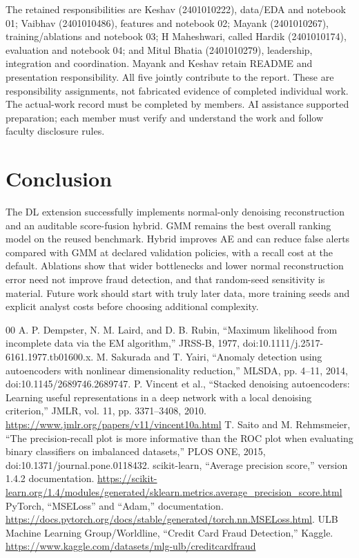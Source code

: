\documentclass[conference]{IEEEtran}
\begin{document}
The retained responsibilities are Keshav (2401010222), data/EDA and notebook 01; Vaibhav (2401010486), features and notebook 02; Mayank (2401010267), training/ablations and notebook 03; H Maheshwari, called Hardik (2401010174), evaluation and notebook 04; and Mitul Bhatia (2401010279), leadership, integration and coordination. Mayank and Keshav retain README and presentation responsibility. All five jointly contribute to the report. These are responsibility assignments, not fabricated evidence of completed individual work. The actual-work record must be completed by members. AI assistance supported preparation; each member must verify and understand the work and follow faculty disclosure rules.

\section{Conclusion}
The DL extension successfully implements normal-only denoising reconstruction and an auditable score-fusion hybrid. GMM remains the best overall ranking model on the reused benchmark. Hybrid improves AE and can reduce false alerts compared with GMM at declared validation policies, with a recall cost at the default. Ablations show that wider bottlenecks and lower normal reconstruction error need not improve fraud detection, and that random-seed sensitivity is material. Future work should start with truly later data, more training seeds and explicit analyst costs before choosing additional complexity.

\begin{thebibliography}{00}
 A. P. Dempster, N. M. Laird, and D. B. Rubin, ``Maximum likelihood from incomplete data via the EM algorithm,'' JRSS-B, 1977, doi:10.1111/j.2517-6161.1977.tb01600.x.
 M. Sakurada and T. Yairi, ``Anomaly detection using autoencoders with nonlinear dimensionality reduction,'' MLSDA, pp. 4--11, 2014, doi:10.1145/2689746.2689747.
 P. Vincent et al., ``Stacked denoising autoencoders: Learning useful representations in a deep network with a local denoising criterion,'' JMLR, vol. 11, pp. 3371--3408, 2010. \url{https://www.jmlr.org/papers/v11/vincent10a.html}
 T. Saito and M. Rehmsmeier, ``The precision-recall plot is more informative than the ROC plot when evaluating binary classifiers on imbalanced datasets,'' PLOS ONE, 2015, doi:10.1371/journal.pone.0118432.
 scikit-learn, ``Average precision score,'' version 1.4.2 documentation. \url{https://scikit-learn.org/1.4/modules/generated/sklearn.metrics.average_precision_score.html}
 PyTorch, ``MSELoss'' and ``Adam,'' documentation. \url{https://docs.pytorch.org/docs/stable/generated/torch.nn.MSELoss.html}.
 ULB Machine Learning Group/Worldline, ``Credit Card Fraud Detection,'' Kaggle. \url{https://www.kaggle.com/datasets/mlg-ulb/creditcardfraud}
\end{thebibliography}
\end{document}
